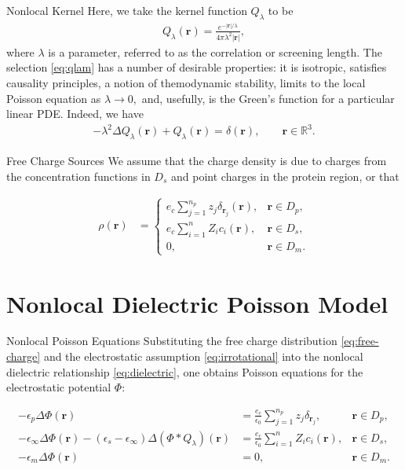 \documentclass{beamer}
\newcommand{\rr}{{\mathbf r}}
\begin{document}
\begin{frame}{Nonlocal Kernel}
    Here, we take the kernel function $Q_\lambda$ to be
    \begin{align}\label{eq:qlam}
        Q_{\lambda}(\rr)=\frac{e^{-|\rr|/\lambda}}{4\pi \lambda^2 |\rr|},
    \end{align}
    where $\lambda$ is a parameter, referred to as the correlation or screening length.  The selection \eqref{eq:qlam} has a number of desirable properties: it is isotropic, satisfies causality principles, a notion of themodynamic stability, limits to the local Poisson equation as $\lambda \to 0,$ and, usefully, is the Green's function for a particular linear PDE. Indeed, we have 
    \begin{align}\label{eq:qlam-fts}
        -\lambda^2 \Delta Q_\lambda(\rr) + Q_\lambda(\rr) = \delta (\rr), \qquad \rr \in \mathbb{R}^3.
    \end{align}
\end{frame}
\begin{frame}{Free Charge Sources}
    We assume that the charge density is due to charges from the concentration functions in $D_s$ and point charges in the protein region, or that 

\begin{align}
    \rho(\rr) &= \begin{cases}
        e_c \sum_{j=1}^{n_p} z_j \delta_{\rr_j}(\rr), &\rr \in { D_p}, \\
	   e_c \sum_{i=1}^n Z_i c_i(\rr), &\rr \in { D_s}, \\
	    0, &\rr \in { D_m}. 
    \end{cases} \label{eq:free-charge}
\end{align}
\end{frame}
\section{Nonlocal Dielectric Poisson Model}
\begin{frame}{Nonlocal Poisson Equations}
    Substituting the free charge distribution \eqref{eq:free-charge} and the electrostatic assumption \eqref{eq:irrotational} into the nonlocal dielectric relationship \eqref{eq:dielectric}, one obtains Poisson equations for the electrostatic potential $\Phi:$

    \begin{align}
    -\epsilon_p\Delta\Phi(\rr) &= \frac{e_{c}}{\epsilon_0}\sum\limits_{j=1}^{n_{p}}z_{j} \delta_{\rr_{j}}, & \rr \in D_p,\\
-\epsilon_{\infty}\Delta\Phi(\rr) - (\epsilon_s-\epsilon_{\infty}) \Delta(\Phi\ast  Q_{\lambda})(\rr)
&= \frac{e_{c}}{\epsilon_0}\sum\limits_{i=1}^{n}Z_{i}c_{i}(\rr), & \rr \in D_s,\\
-\epsilon_m \Delta \Phi(\rr) &= 0, & \rr \in D_m. 
\end{align}
\end{frame}
\end{document}
